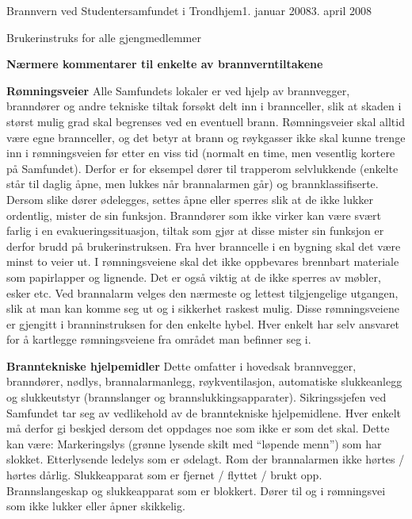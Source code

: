 \begin{instruks}{Brannvern ved Studentersamfundet i Trondhjem}{1. januar 2008}{3. april 2008}
\begin{instruksledd}{Brukerinstruks for alle gjengmedlemmer}
        \begin{center}
            \textbf{Nærmere kommentarer til enkelte av brannverntiltakene} 
        \end{center}
        \begin{description}
            \item \textbf{Rømningsveier} Alle Samfundets lokaler er ved hjelp av brannvegger, branndører og andre tekniske tiltak
                forsøkt delt inn i brannceller, slik at skaden i størst mulig grad skal begrenses ved en eventuell brann.
                Rømningsveier skal alltid være egne brannceller, og det betyr at brann og røykgasser ikke skal kunne trenge inn i
                rømningsveien før etter en viss tid (normalt en time, men vesentlig kortere på Samfundet). Derfor er for eksempel dører til
                trapperom selvlukkende (enkelte står til daglig åpne, men lukkes når brannalarmen går) og brannklassifiserte.
                Dersom slike dører ødelegges, settes åpne eller sperres slik at de ikke lukker ordentlig, mister de sin funksjon.
                Branndører som ikke virker kan være svært farlig i en evakueringssituasjon, tiltak som gjør at disse mister sin funksjon er
                derfor brudd på brukerinstruksen. Fra hver branncelle i en bygning skal det være minst to veier ut. I rømningsveiene skal
                det ikke oppbevares brennbart materiale som papirlapper og lignende. Det er også viktig at de ikke sperres av møbler,
                esker etc. Ved brannalarm velges den nærmeste og lettest tilgjengelige utgangen, slik at man kan
                komme seg ut og i sikkerhet raskest mulig. Disse rømningsveiene er gjengitt i branninstruksen for den enkelte hybel.
                Hver enkelt har selv ansvaret for å kartlegge rømningsveiene fra området man befinner seg i.

            \item \textbf{Branntekniske hjelpemidler} Dette omfatter i hovedsak brannvegger, branndører, nødlys, 
                brannalarmanlegg, røykventilasjon,
                automatiske slukkeanlegg og slukkeutstyr (brannslanger og brannslukkingsapparater).
                Sikringssjefen ved Samfundet tar seg av vedlikehold av de branntekniske hjelpemidlene. Hver enkelt må derfor gi beskjed
                dersom det oppdages noe som ikke er som det skal. Dette kan være: Markeringslys 
                (grønne lysende skilt med ``løpende menn'') som har slokket.
                Etterlysende ledelys som er ødelagt. Rom der brannalarmen ikke hørtes / hørtes dårlig. Slukkeapparat 
                som er fjernet / flyttet / brukt opp.
                Brannslangeskap og slukkeapparat som er blokkert. Dører til og i rømningsvei som ikke lukker eller åpner skikkelig.
        \end{description}

    \end{instruksledd}

\end{instruks}


